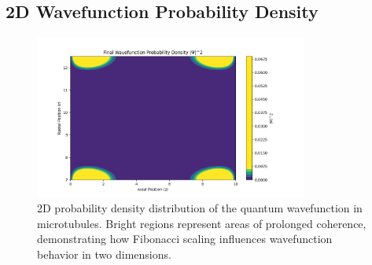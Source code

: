 \documentclass[entropy,article,submit,oneauthor,pdftex]{Definitions/mdpi}
\begin{document}
\subsection{2D Wavefunction Probability Density}
\begin{figure}[H]
    \centering
    \includegraphics[width=0.8\textwidth]{figures/2D_wavefunction_PD.png}
    \caption{2D probability density distribution of the quantum wavefunction in microtubules. Bright regions represent areas of prolonged coherence, demonstrating how Fibonacci scaling influences wavefunction behavior in two dimensions.}
    \label{fig:wavefunction_2D}
\end{figure}
\end{document}

